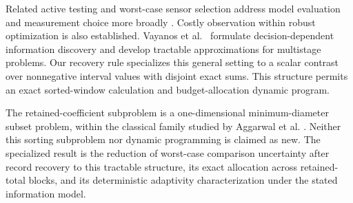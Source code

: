\documentclass[12pt]{article}
\begin{document}
Related active testing and worst-case sensor selection address model
evaluation and measurement choice more broadly \cite{active,sensorsel}.
Costly observation within robust optimization is also established.
Vayanos et al.\ \cite{ddid} formulate decision-dependent information
discovery and develop tractable approximations for multistage problems.
Our recovery rule specializes this general setting to a scalar contrast
over nonnegative interval values with disjoint exact sums. This structure
permits an exact sorted-window calculation and budget-allocation dynamic
program.

The retained-coefficient subproblem is a one-dimensional minimum-diameter
subset problem, within the classical family studied by Aggarwal et al.
\cite{aggarwal}. Neither this sorting subproblem nor dynamic programming
is claimed as new. The specialized result is the reduction of worst-case
comparison uncertainty after record recovery to this tractable structure,
its exact allocation across retained-total blocks, and its deterministic
adaptivity characterization under the stated information model.
\end{document}
